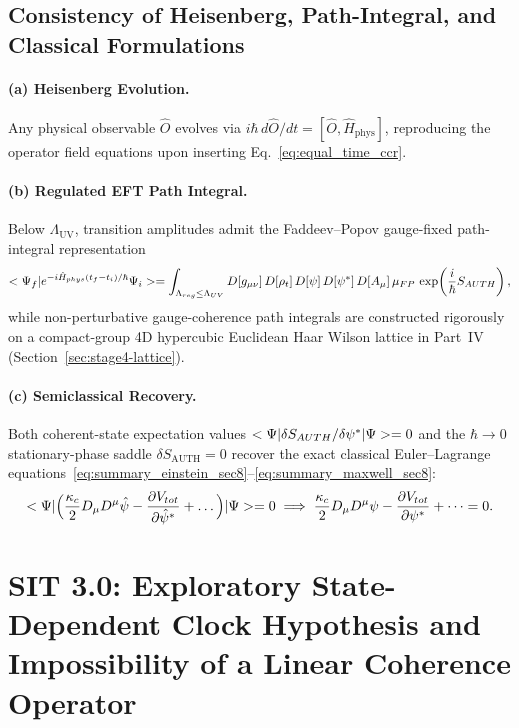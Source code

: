 \subsection{Consistency of Heisenberg, Path-Integral, and Classical Formulations}

\paragraph{(a) Heisenberg Evolution.} Any physical observable $\hat{O}$ evolves via $i\hbar\,d\hat{O}/dt = [\hat{O}, \hat{H}_{\mathrm{phys}}]$, reproducing the operator field equations upon inserting Eq.~\eqref{eq:equal_time_ccr}.

\paragraph{(b) Regulated EFT Path Integral.} Below $\Lambda_{\mathrm{UV}}$, transition amplitudes admit the Faddeev--Popov gauge-fixed path-integral representation
\begin{equation}
<\Psi_f|e^{-i\hat{H}_{phys}(t_f-t_i)/\hbar}\Psi_i>
= \int_{\Lambda_{reg} \le \Lambda_{UV}} D[g_{\mu\nu}]\,D[\rho_t]\,D[\psi]\,D[\psi^*]\,D[A_\mu]\,\mu_{FP}\,
  \exp\!\left(\frac{i}{\hbar}S_{AUTH}\right),
\label{eq:eft_path_integral}
\end{equation}
while non-perturbative gauge-coherence path integrals are constructed rigorously on a compact-group 4D hypercubic Euclidean Haar Wilson lattice in Part~IV (Section~\ref{sec:stage4-lattice}).

\paragraph{(c) Semiclassical Recovery.} Both coherent-state expectation values $<\Psi|\delta S_{AUTH}/\delta\psi^*|\Psi> = 0$ and the $\hbar \to 0$ stationary-phase saddle $\delta S_{\mathrm{AUTH}} = 0$ recover the exact classical Euler--Lagrange equations~\eqref{eq:summary_einstein_sec8}--\eqref{eq:summary_maxwell_sec8}:
\[
<\Psi|\Bigl(\frac{\kappa_c}{2} D_\mu D^\mu\hat{\psi} - \frac{\partial V_{tot}}{\partial\hat{\psi}^*} + \dots\Bigr)|\Psi> = 0
\;\Longrightarrow\;
\frac{\kappa_c}{2} D_\mu D^\mu\psi - \frac{\partial V_{tot}}{\partial\psi^*} + \dots = 0.
\]

\section{SIT 3.0: Exploratory State-Dependent Clock Hypothesis and Impossibility of a Linear Coherence Operator}
\label{sec:SIT3}
\label{sec:QIP}

